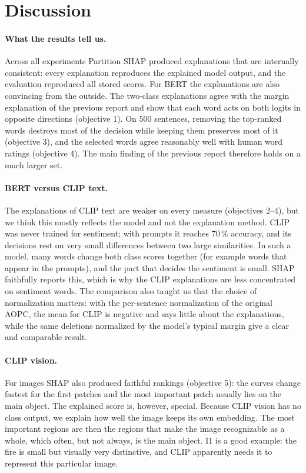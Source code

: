 \documentclass[11pt,a4paper]{article}
\begin{document}
\section{Discussion}\label{sec:discussion}

\paragraph{What the results tell us.} Across all experiments Partition SHAP produced
explanations that are internally consistent: every explanation reproduces the explained
model output, and the evaluation reproduced all stored scores. For BERT the explanations
are also convincing from the outside. The two-class explanations agree with the margin
explanation of the previous report and show that each word acts on both logits in
opposite directions (objective 1). On 500 sentences, removing the top-ranked words destroys
most of the decision while keeping them preserves most of it (objective 3), and the
selected words agree reasonably well with human word ratings (objective 4). The main
finding of the previous report therefore holds on a much larger set.

\paragraph{BERT versus CLIP text.} The explanations of CLIP text are weaker on every
measure (objectives 2--4), but we think this mostly reflects the model and not the
explanation method. CLIP was never trained for sentiment; with prompts it reaches 70\,\%
accuracy, and its decisions rest on very small differences between two large similarities.
In such a model, many words change both class scores together (for example words that
appear in the prompts), and the part that decides the sentiment is small. SHAP faithfully
reports this, which is why the CLIP explanations are less concentrated on sentiment words.
The comparison also taught us that the choice of normalization matters: with the
per-sentence normalization of the original AOPC, the mean for CLIP is negative and says
little about the explanations, while the same deletions normalized by the model's typical
margin give a clear and comparable result.

\paragraph{CLIP vision.} For images SHAP also produced faithful rankings (objective 5): the
curves change fastest for the first patches and the most important patch usually lies on the
main object. The explained score is, however, special. Because CLIP vision has no class
output, we explain how well the image keeps its own embedding. The most important regions
are then the regions that make the image recognizable as a whole, which often, but not
always, is the main object. I1 is a good example: the fire is small but visually very
distinctive, and CLIP apparently needs it to represent this particular image.
\end{document}
